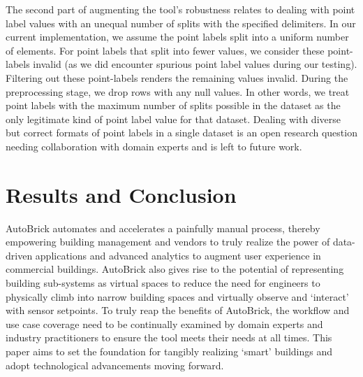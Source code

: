 \documentclass[twocolumn, switch]{article} %
\begin{document}
	The second part of augmenting the tool’s robustness relates to dealing with point label values with an unequal number of splits with the specified delimiters. In our current implementation, we assume the point labels split into a uniform number of elements. For point labels that split into fewer values, we consider these point-labels invalid (as we did encounter spurious point label values during our testing). Filtering out these point-labels renders the remaining values invalid. During the preprocessing stage, we drop rows with any null values. In other words, we treat point labels with the maximum number of splits possible in the dataset as the only legitimate kind of point label value for that dataset. Dealing with diverse but correct formats of point labels in a single dataset is an open research question needing collaboration with domain experts and is left to future work.


\section{Results and Conclusion}
AutoBrick automates and accelerates a painfully manual process, thereby empowering building management and vendors to truly realize the power of data-driven applications and advanced analytics to augment user experience in commercial buildings. AutoBrick also gives rise to the potential of representing building sub-systems as virtual spaces to reduce the need for engineers to physically climb into narrow building spaces and virtually observe and ‘interact’ with sensor setpoints. To truly reap the benefits of AutoBrick, the workflow and use case coverage need to be continually examined by domain experts and industry practitioners to ensure the tool meets their needs at all times. This paper aims to set the foundation for tangibly realizing ‘smart’ buildings and adopt technological advancements moving forward.


\end{document}

